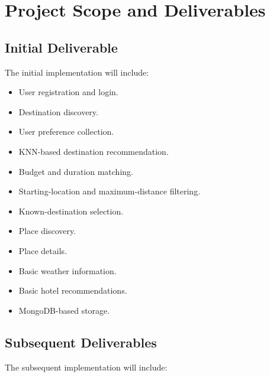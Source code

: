 \documentclass[11pt,a4paper]{article}
\begin{document}
\section{Project Scope and Deliverables}

\subsection{Initial Deliverable}

The initial implementation will include:

\begin{itemize}

\item User registration and login.

\item Destination discovery.

\item User preference collection.

\item KNN-based destination recommendation.

\item Budget and duration matching.

\item Starting-location and maximum-distance filtering.

\item Known-destination selection.

\item Place discovery.

\item Place details.

\item Basic weather information.

\item Basic hotel recommendations.

\item MongoDB-based storage.

\end{itemize}


\subsection{Subsequent Deliverables}

The subsequent implementation will include:
\end{document}
